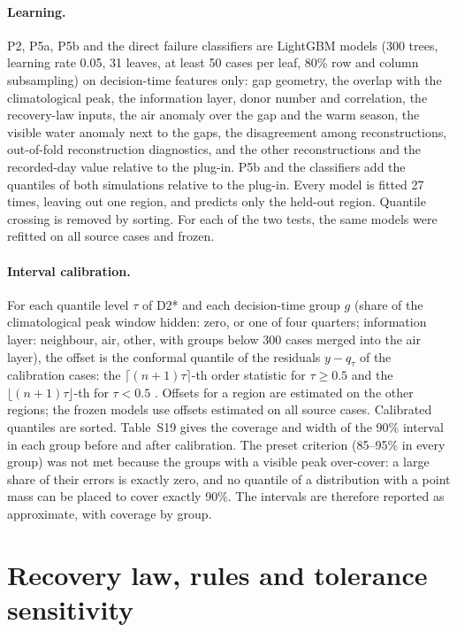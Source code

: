 \documentclass[draft]{agujournal2025}
\begin{document}
\paragraph{Learning.} P2, P5a, P5b and the direct failure classifiers are LightGBM models (300 trees, learning rate 0.05, 31 leaves, at least 50 cases per leaf, 80\% row and column subsampling) on decision-time features only: gap geometry, the overlap with the climatological peak, the information layer, donor number and correlation, the recovery-law inputs, the air anomaly over the gap and the warm season, the visible water anomaly next to the gaps, the disagreement among reconstructions, out-of-fold reconstruction diagnostics, and the other reconstructions and the recorded-day value relative to the plug-in. P5b and the classifiers add the quantiles of both simulations relative to the plug-in. Every model is fitted 27 times, leaving out one region, and predicts only the held-out region. Quantile crossing is removed by sorting. For each of the two tests, the same models were refitted on all source cases and frozen.

\paragraph{Interval calibration.} For each quantile level $\tau$ of D2* and each decision-time group $g$ (share of the climatological peak window hidden: zero, or one of four quarters; information layer: neighbour, air, other, with groups below 300 cases merged into the air layer), the offset is the conformal quantile of the residuals $y - q_\tau$ of the calibration cases: the $\lceil (n+1)\tau \rceil$-th order statistic for $\tau \geq 0.5$ and the $\lfloor (n+1)\tau \rfloor$-th for $\tau < 0.5$ \cite{romano2019}. Offsets for a region are estimated on the other regions; the frozen models use offsets estimated on all source cases. Calibrated quantiles are sorted. Table~S19 gives the coverage and width of the 90\% interval in each group before and after calibration. The preset criterion (85--95\% in every group) was not met because the groups with a visible peak over-cover: a large share of their errors is exactly zero, and no quantile of a distribution with a point mass can be placed to cover exactly 90\%. The intervals are therefore reported as approximate, with coverage by group.

\section{Recovery law, rules and tolerance sensitivity}
\end{document}
